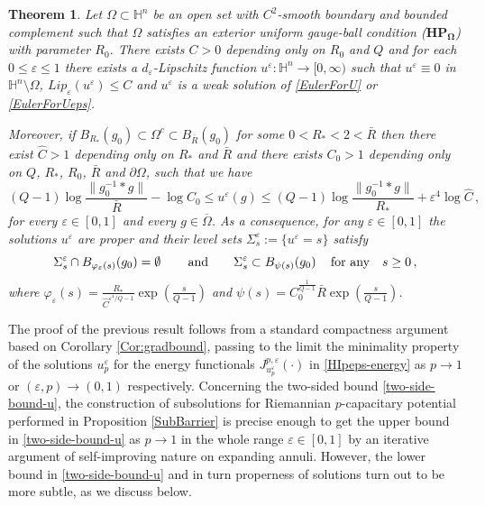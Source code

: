 \documentclass[10pt]{amsart}
\numberwithin{equation}{section}
\newtheorem{theorem}{Theorem}[section]
\theoremstyle{definition}
\newcommand{\He}{\mathbb{H}}
\begin{document}
\begin{theorem}
\label{Thm:existence}
Let $\Omega \subset \He^n$ be an open set with $C^2$-smooth boundary and bounded complement such that $\Omega$ satisfies an exterior uniform gauge-ball
condition ($\mathbf{HP_\Omega}$) with parameter $R_0$. There exists $C>0$ depending only on $R_0$ and $Q$ and for each $0\leq\varepsilon \leq 1$ there exists a $d_\varepsilon$-Lipschitz function $u^\varepsilon: \mathbb{H}^n \to [0,\infty)$ such that $u^\varepsilon \equiv 0$ in $\mathbb{H}^n \setminus \Omega$, $Lip_\varepsilon(u^\varepsilon) \leq C$ and $u^\varepsilon$ is a weak solution of \eqref{EulerForU} or \eqref{EulerForUeps}. 


Moreover, if $B_{R_\ast}(g_0) \subset \Omega^c \subset B_{\bar{R}}(g_0)$ for some $0<R_\ast<2<\bar{R}$ then there exist $\widehat{C}>1$ depending only on $R_\ast$ and $\bar{R}$ and there exists $C_{0}>1$ depending only on $Q$, $R_\ast$, $R_0$, $\bar{R}$ and $ \partial \Omega$, such that we have
\begin{equation}
\label{two-side-bound-u}
  (Q-1) \log \frac{\|  g_0^{-1} *g\|}{\bar{R}} -\log C_{0}  \leq u^\varepsilon (g) \leq  (Q-1)  \log \frac{\| g_0^{-1} * g\|}{R_\ast}  +\varepsilon^4 \log \widehat{C}\, ,
\end{equation}
for every $\varepsilon \in [0,1]$ and every $g \in \overline{\Omega}$. As a consequence, for any $\varepsilon \in [0,1]$ the solutions $u^\varepsilon$ are proper and their level sets $\Sigma^\varepsilon_s:=\{ u^\varepsilon=s\}$ satisfy
\begin{equation}
\label{in-out-spheres}
 \Sigma^\varepsilon_s \cap B_{\varphi_\varepsilon(s)}(g_0)=\emptyset \,  \qquad \hbox{and}  \qquad \Sigma^\varepsilon_s \subset B_{\psi (s)}(g_0) \,  \quad \hbox{for any} \quad s \geq 0 \, ,
 \end{equation}
where $\displaystyle{\varphi_\varepsilon(s)=\frac{R_\ast}{\widehat{C}^{\varepsilon^4/Q-1}} \exp{\left(\frac{s}{Q-1}\right)} }$ and $\displaystyle{\psi (s)=C_0^\frac{1}{Q-1}  \bar{R} \exp{\left(\frac{s}{Q-1} \right)}}$. 
\end{theorem}

The proof of the previous result follows from a standard compactness argument based on Corollary \ref{Cor:gradbound}, passing to the limit the minimality property of the solutions $u^\varepsilon_p$ for the energy functionals $J^{p,\varepsilon}_{u^\varepsilon_p}(\cdot)$ in \eqref{HIpeps-energy} as $p \to 1$ or $(\varepsilon,p) \to (0,1)$ respectively. 
Concerning the two-sided bound \eqref{two-side-bound-u}, the construction of subsolutions for Riemannian $p$-capacitary potential performed in Proposition \ref{SubBarrier} is precise enough to get the upper bound in \eqref{two-side-bound-u} as $p \to 1$ in the whole range $\varepsilon \in [0,1]$ by an iterative argument of self-improving nature on expanding annuli. However, the lower bound in \eqref{two-side-bound-u} and in turn properness of solutions turn out to be more subtle, as we discuss below. 
\end{document}

